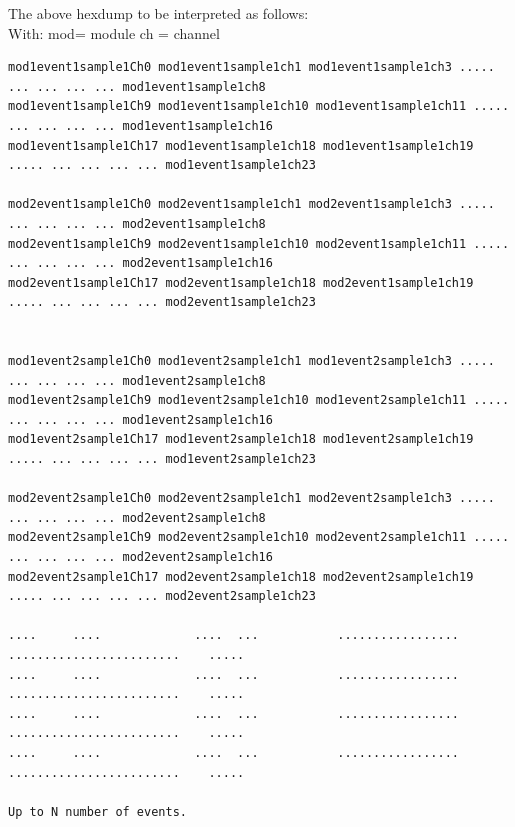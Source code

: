 \documentclass[12pt]{article}
\begin{document}
The above hexdump to be interpreted as follows:\\
With: mod= module  ch = channel\\
\begingroup
    \fontsize{8pt}{12pt}\selectfont
    \begin{verbatim}      
mod1event1sample1Ch0 mod1event1sample1ch1 mod1event1sample1ch3 ..... ... ... ... ... mod1event1sample1ch8 
mod1event1sample1Ch9 mod1event1sample1ch10 mod1event1sample1ch11 ..... ... ... ... ... mod1event1sample1ch16
mod1event1sample1Ch17 mod1event1sample1ch18 mod1event1sample1ch19 ..... ... ... ... ... mod1event1sample1ch23

mod2event1sample1Ch0 mod2event1sample1ch1 mod2event1sample1ch3 ..... ... ... ... ... mod2event1sample1ch8 
mod2event1sample1Ch9 mod2event1sample1ch10 mod2event1sample1ch11 ..... ... ... ... ... mod2event1sample1ch16
mod2event1sample1Ch17 mod2event1sample1ch18 mod2event1sample1ch19 ..... ... ... ... ... mod2event1sample1ch23


mod1event2sample1Ch0 mod1event2sample1ch1 mod1event2sample1ch3 ..... ... ... ... ... mod1event2sample1ch8 
mod1event2sample1Ch9 mod1event2sample1ch10 mod1event2sample1ch11 ..... ... ... ... ... mod1event2sample1ch16
mod1event2sample1Ch17 mod1event2sample1ch18 mod1event2sample1ch19 ..... ... ... ... ... mod1event2sample1ch23

mod2event2sample1Ch0 mod2event2sample1ch1 mod2event2sample1ch3 ..... ... ... ... ... mod2event2sample1ch8
mod2event2sample1Ch9 mod2event2sample1ch10 mod2event2sample1ch11 ..... ... ... ... ... mod2event2sample1ch16
mod2event2sample1Ch17 mod2event2sample1ch18 mod2event2sample1ch19 ..... ... ... ... ... mod2event2sample1ch23
  
....     ....             ....  ...           .................             ........................    .....
....     ....             ....  ...           .................             ........................    .....
....     ....             ....  ...           .................             ........................    .....
....     ....             ....  ...           .................             ........................    .....

Up to N number of events.
\end{verbatim}    
\endgroup
\end{document}
